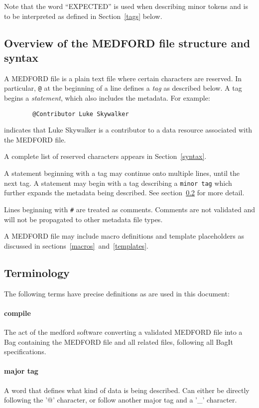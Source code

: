 \documentclass[10pt]{article}
\begin{document}
{{	    Note that the word ``EXPECTED'' is used when describing minor tokens and is to be interpreted as defined in Section~\ref{tags} below.
	}
	
	\subsection{Overview of the MEDFORD file structure and syntax}{
	
	A MEDFORD file is a plain text file where certain characters are reserved.
	In particular, \texttt{@} at the beginning of a line defines a \textit{tag} as described below. A tag begins a \textit{statement}, which also includes the metadata. For example:
	
	\begin{verbatim}
	    @Contributor Luke Skywalker
	\end{verbatim}
	
	indicates that Luke Skywalker is a contributor to a data resource associated with the MEDFORD file.
	
	A complete list of reserved characters appears in Section~\ref{syntax}.
	
	A statement beginning with a tag may continue onto multiple lines, until the next tag.
	A statement may begin with a tag describing a \texttt{minor tag} which further expands the metadata being described. See section~\ref{terminology} for more detail.
	
	Lines beginning with \texttt{\#} are treated as comments.
	Comments are not validated and will not be propagated to other metadata file types.
	
	A MEDFORD file may include macro definitions and template placeholders as discussed in sections~\ref{macros}~and~\ref{templates}.
	
	}
	\subsection{Terminology} \label{terminology} {
    	The following terms have precise definitions as are used in this document:
	    
	    \paragraph{compile} The act of the medford software converting a validated MEDFORD file into a Bag containing the MEDFORD file and all related files, following all BagIt specifications.

	    \paragraph{major tag} A word that defines what kind of data is being described. Can either be directly following the '@' character, or follow another major tag and a '\_' character.
	    
}}
\end{document}
